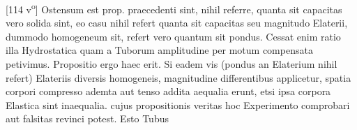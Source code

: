 \pstart 
[114 v\textsuperscript{o}]  Ostensum est prop. praecedenti  sint, nihil referre, quanta sit capacitas  vero solida sint, eo casu nihil refert quanta sit capacitas seu magnitudo Elaterii\protect{}, dummodo homogeneum sit, refert vero quantum sit pondus\protect{}. Cessat enim ratio illa Hydrostatica\protect{} quam a Tuborum amplitudine per motum compensata petivimus. Propositio ergo haec erit. Si eadem vis (pondus\protect{} an Elaterium\protect{} nihil refert) Elateriis\protect{} diversis homogeneis, magnitudine differentibus applicetur, spatia corpori compresso ademta aut tenso addita  aequalia erunt, etsi ipsa corpora Elastica\protect{} sint  inaequalia.  cujus propositionis veritas hoc Experimento comprobari aut falsitas revinci potest. Esto Tubus  
